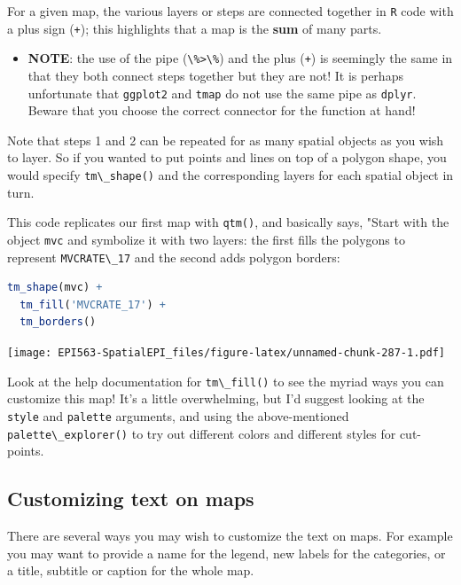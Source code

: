 \documentclass[
]{book}
\newcommand{\passthrough}[1]{#1}
\newenvironment{rmdblock}[1]
  {%
  \begin{itemize}
  \renewcommand{\labelitemi}{
    \raisebox{-.7\height}[0pt][0pt]{
      {\setkeys{Gin}{width=3em,keepaspectratio}\texttt{[image: images/\#1]}}
    }
  }
  \item
  }
  {
  \end{itemize}
  }
\newenvironment{rmdcaution}
  {\begin{rmdblock}{caution}}
  {\end{rmdblock}}
\begin{document}
For a given map, the various layers or steps are connected together in \passthrough{\lstinline!R!} code with a plus sign (\passthrough{\lstinline!+!}); this highlights that a map is the \textbf{sum} of many parts.

\begin{rmdcaution}
\textbf{NOTE}: the use of the pipe (\passthrough{\lstinline!\%>\%!}) and the plus (\passthrough{\lstinline!+!}) is seemingly the same in that they both connect steps together but they are not! It is perhaps unfortunate that \passthrough{\lstinline!ggplot2!} and \passthrough{\lstinline!tmap!} do not use the same pipe as \passthrough{\lstinline!dplyr!}. Beware that you choose the correct connector for the function at hand!
\end{rmdcaution}

Note that steps 1 and 2 can be repeated for as many spatial objects as you wish to layer. So if you wanted to put points and lines on top of a polygon shape, you would specify \passthrough{\lstinline!tm\_shape()!} and the corresponding layers for each spatial object in turn.

This code replicates our first map with \passthrough{\lstinline!qtm()!}, and basically says, "Start with the object \passthrough{\lstinline!mvc!} and symbolize it with two layers: the first fills the polygons to represent \passthrough{\lstinline!MVCRATE\_17!} and the second adds polygon borders:

\begin{lstlisting}[language=R]
tm_shape(mvc) +
  tm_fill('MVCRATE_17') +
  tm_borders()
\end{lstlisting}

\texttt{[image: EPI563-SpatialEPI\_files/figure-latex/unnamed-chunk-287-1.pdf]}

Look at the help documentation for \passthrough{\lstinline!tm\_fill()!} to see the myriad ways you can customize this map! It's a little overwhelming, but I'd suggest looking at the \passthrough{\lstinline!style!} and \passthrough{\lstinline!palette!} arguments, and using the above-mentioned \passthrough{\lstinline!palette\_explorer()!} to try out different colors and different styles for cut-points.

\hypertarget{customizing-text-on-maps}{%
\subsection{Customizing text on maps}\label{customizing-text-on-maps}}

There are several ways you may wish to customize the text on maps. For example you may want to provide a name for the legend, new labels for the categories, or a title, subtitle or caption for the whole map.
\end{document}
